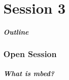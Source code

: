 \part{Session 3}

\begin{frame}[t]
	\frametitle{Outline}
	\tableofcontents[part=3,pausesections]
\end{frame}

\section{Open Session}
\begin{frame}[t]
	\frametitle{What is mbed?}
\end{frame}